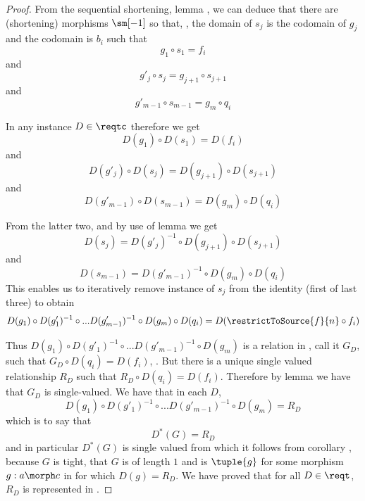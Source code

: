 \begin{proof}

From the sequential shortening, 
lemma ,
 we can deduce that there are
(shortening) morphisms $\sm[-1]$ so that, \foreachj[m-2],
the domain of  $s_j$ is the codomain of $g_j$ and 
the codomain  is $b_i$ such that 
\[
g_1 \circ s_1 = f_i
\]
and \foreachj[m-1]
\[
g'_j \circ s_j = g_{j+1} \circ s_{j+1}
\]
and
\[
g'_{m-1} \circ s_{m-1} = g_m \circ q_i
\] 

In any instance $D \in \reqtc$ therefore we get
\[
D(g_1) \circ D(s_1) = D(f_i)
\]
and \foreachj[m-2]
\[
D(g'_j) \circ D(s_j) = D(g_{j+1}) \circ D(s_{j+1})
\]
and
\[
D(g'_{m-1}) \circ D(s_{m-1}) = D(g_m) \circ D(q_i)
\]

From the latter two, and by use of  lemma  we get
\[
D(s_j) = D(g'_j)^{-1} \circ D(g_{j+1}) \circ D(s_{j+1})
\]
and
\[
 D(s_{m-1}) = D(g'_{m-1})^{-1} \circ D(g_m) \circ D(q_i)
\]
This enables us to iteratively remove instance of $s_j$ from the identity (first of last three)
to obtain 
\[
D(g_1) \circ D(g'_1)^{-1} \circ ... 
D(g'_{m-1})^{-1} \circ D(g_m)  \circ D(q_i)
= D(\restrictToSource{f}{n} \circ f_i)
\]

Thus $D(g_1) \circ D(g'_1)^{-1} \circ ... D(g'_{m-1})^{-1} \circ D(g_m)$
is a relation in \Rel , call it $G_D$, such that $G_D \circ D(q_i) = D(f_i)$, \foreachi. 
But there is a unique single valued relationship $R_D$
such that  $R_D \circ D(q_i) = D(f_i)$. 
Therefore by lemma  we have that $G_D$ is single-valued. We have that in each $D$,
\[
D(g_1) \circ D(g'_1)^{-1} \circ ... D(g'_{m-1})^{-1} \circ D(g_m) = R_D
\]
which is to say that
\[
D^*(G)=R_D
\]
and in particular $D^*(G)$ is single valued from which it follows from corollary  
, because $G$ is tight, that $G$ is of length $1$ and
is $\tuple{g}$ 
for some morphism $g:a \morph c$ in \catcw
for which $D(g)=R_D$. We have proved that 
for all $D \in \reqt$, $R_D$ is represented in \catc. 

\end{proof}

